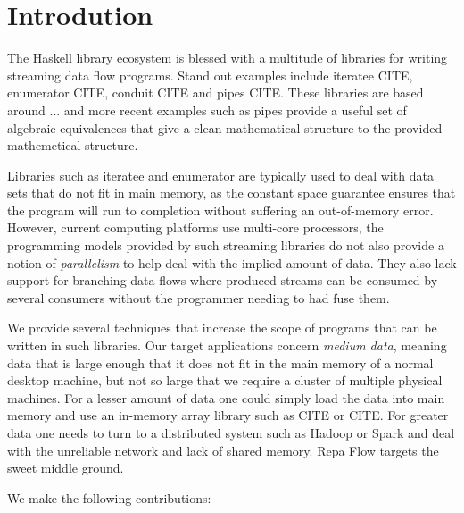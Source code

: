\section{Introdution}

The Haskell library ecosystem is blessed with a multitude of libraries for writing streaming data flow programs. Stand out examples include iteratee CITE, enumerator CITE, conduit CITE and pipes CITE. These libraries are based around ... and more recent examples such as pipes provide a useful set of algebraic equivalences that give a clean mathematical structure to the provided mathemetical structure.

Libraries such as iteratee and enumerator are typically used to deal with data sets that do not fit in main memory, as the constant space guarantee ensures that the program will run to completion without suffering an out-of-memory error. However, current computing platforms use multi-core processors, the programming models provided by such streaming libraries do not also provide a notion of \emph{parallelism} to help deal with the implied amount of data. They also lack support for branching data flows where produced streams can be consumed by several consumers without the programmer needing to had fuse them.

We provide several techniques that increase the scope of programs that can be written in such libraries. Our target applications concern \emph{medium data}, meaning data that is large enough that it does not fit in the main memory of a normal desktop machine, but not so large that we require a cluster of multiple physical machines. For a lesser amount of data one could simply load the data into main memory and use an in-memory array library such as CITE or CITE. For greater data one needs to turn to a distributed system such as Hadoop or Spark and deal with the unreliable network and lack of shared memory. Repa Flow targets the sweet middle ground.

We make the following contributions:

